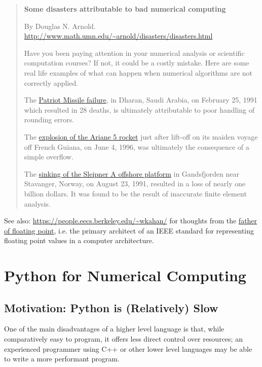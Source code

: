 \documentclass[12pt,letterpaper,twoside]{article}
\begin{document}
{
  \small
\begin{quote}
\textbf{Some disasters attributable to bad numerical computing}

By Douglas N. Arnold.
{\footnotesize \url{http://www.math.umn.edu/~arnold/disasters/disasters.html}}

Have you been paying attention in your numerical analysis or scientific
computation courses? If not, it could be a costly mistake. Here are some
real life examples of what can happen when numerical algorithms are not
correctly applied.

The
\href{http://www-users.math.umn.edu/~arnold/disasters/patriot.html}{Patriot
  Missile failure},
in Dharan, Saudi Arabia, on February 25,
1991 which resulted in 28 deaths, is ultimately attributable to poor
handling of rounding errors.

The \href{http://www-users.math.umn.edu/~arnold/disasters/ariane.html}{explosion of the Ariane 5 rocket} just after lift-off on its maiden
voyage off French Guiana, on June 4, 1996, was ultimately the
consequence of a simple overflow.

The
\href{http://www-users.math.umn.edu/~arnold/disasters/sleipner.html}{sinking
  of the Sleipner A offshore platform}
in Gandsfjorden near
Stavanger, Norway, on August 23, 1991, resulted in a loss of nearly one
billion dollars. It was found to be the result of inaccurate finite
element analysis.
\end{quote}
}

See also: \url{https://people.eecs.berkeley.edu/~wkahan/} for thoughts
from the \href{https://en.wikipedia.org/wiki/William_Kahan}{father of
  floating point}, i.e. the primary architect of an IEEE standard for
representing floating point values in a computer architecture. 


\section{Python for Numerical Computing}
\subsection{Motivation: Python is (Relatively) Slow}
One of the main disadvantages of a higher level language is that, while
comparatively easy to program, it offers less direct control over
resources; an experienced programmer using C++ or other lower level
languages
may be able to write a more performant program.
\end{document}
